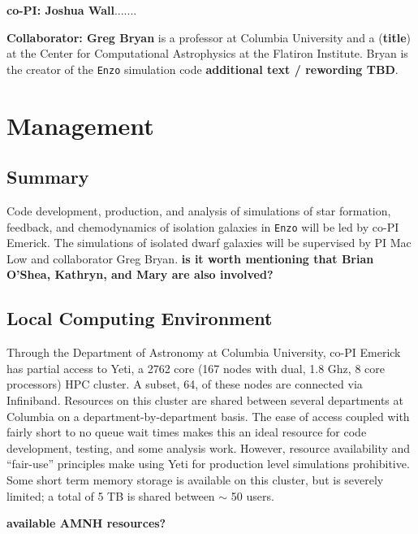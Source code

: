 \documentclass[11pt]{article}
\begin{document}
\textbf{co-PI: Joshua Wall}.......

\textbf{Collaborator: Greg Bryan} is a professor at Columbia University and a ({\bf title}) at the Center for Computational Astrophysics at the Flatiron Institute. Bryan is the creator of the \texttt{Enzo} simulation code {\bf additional text / rewording TBD}.

\section{Management}

\subsection{Summary}

Code development, production, and analysis of simulations of star formation, feedback, and chemodynamics of isolation galaxies in \texttt{Enzo} will be led by co-PI Emerick. The simulations of isolated dwarf galaxies will be supervised by PI Mac Low and collaborator Greg Bryan. {\bf is it worth mentioning that Brian O'Shea, Kathryn, and Mary are also involved?}

\subsection{Local Computing Environment}

Through the Department of Astronomy at Columbia University, co-PI Emerick has partial access to Yeti, a 2762 core (167 nodes with dual, 1.8 Ghz, 8 core processors) HPC cluster. A subset, 64, of these nodes are connected via Infiniband. Resources on this cluster are shared between several departments at Columbia on a department-by-department basis. The ease of access coupled with fairly short to no queue wait times makes this an ideal resource for code development, testing, and some analysis work. However, resource availability and ``fair-use'' principles make using Yeti for production level simulations prohibitive. Some short term memory storage is available on this cluster, but is severely limited; a total of 5 TB is shared between $\sim$ 50 users.

{\bf available AMNH resources?}




\end{document}
